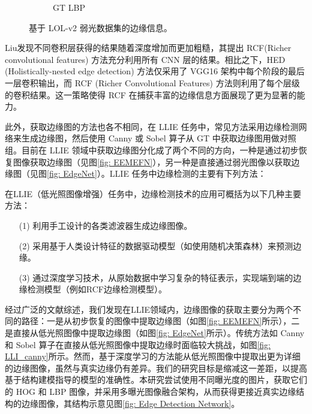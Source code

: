 \documentclass[a4paper]{ctexart}
\begin{document}
\begin{figure}[htb]
\begin{subfigure}{0.19\textwidth}
			\captionsetup{font=scriptsize}
			\caption{GT LBP}
			\label{fig: GT_lbp}	
		\end{subfigure}
		\caption{
			\label{fig: LLI Structure Information}
			基于 LOL-v2 弱光数据集的边缘信息。
		}
	\end{figure}
	
	Liu\cite{liu2017richer}发现不同卷积层获得的结果随着深度增加而更加粗糙，其提出 RCF(Richer convolutional features) 方法充分利用所有 CNN 层的结果。相比之下，HED (Holistically-nested edge detection) \cite{xie2015holistically}方法仅采用了 VGG16 架构中每个阶段的最后一层卷积输出，而 RCF (Richer Convolutional Features) 方法则利用了每个层级的卷积结果。这一策略使得 RCF 在捕获丰富的边缘信息方面展现了更为显著的能力。
	
	此外，获取边缘图的方法也各不相同，在 LLIE 任务中，常见方法采用边缘检测网络来生成边缘图，然后使用 Canny 或 Sobel 算子\cite{maini2009study}从 GT 中获取边缘图用做对照组。目前在 LLIE 领域中获取边缘图分化成了两个不同的方向，一种是通过初步恢复图像获取边缘图（见图\ref{fig: EEMEFN}），另一种是直接通过弱光图像以获取边缘图（见图\ref{fig: EdgeNet}）。LLIE 任务中边缘检测的主要有下列方法：
	
	在LLIE（低光照图像增强）任务中，边缘检测技术的应用可概括为以下几种主要方法：
	
	\begin{itemize}
		\item [(1)] 利用手工设计的各类滤波器生成边缘图像。
		
		\item [(2)] 采用基于人类设计特征的数据驱动模型（如使用随机决策森林）来预测边缘。
		
		\item [(3)] 通过深度学习技术，从原始数据中学习复杂的特征表示，实现端到端的边缘检测模型（例如RCF边缘检测模型\cite{liu2017richer}）。
	\end{itemize}
	
	经过广泛的文献综述，我们发现在LLIE领域内，边缘图像的获取主要分为两个不同的路径：一是从初步恢复的图像中提取边缘图（如图\ref{fig: EEMEFN}所示），二是直接从低光照图像中提取边缘图（如图\ref{fig: EdgeNet}所示）。传统方法如 Canny 和 Sobel 算子\cite{maini2009study}在直接从低光照图像中提取边缘时面临较大挑战，如图\ref{fig: LLI_canny}所示。然而，基于深度学习的方法能从低光照图像中提取出更为详细的边缘图像，虽然与真实边缘仍有差异。我们的研究目标是缩减这一差距，以提高基于结构建模指导的模型的准确性。本研究尝试使用不同曝光度的图片，获取它们的 HOG 和 LBP 图像，并采用多曝光图像融合架构，从而获得更接近真实边缘结构的边缘图像，其结构示意见图\ref{fig: Edge Detection Network}。
	
\end{document}
